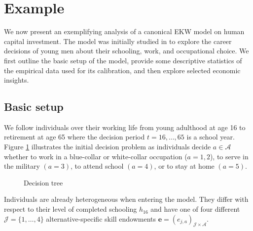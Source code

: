\section{Example}\label{Example}
We now present an exemplifying analysis of a canonical EKW model on human capital investment. The model was initially studied in \citet{Keane.1997} to explore the career decisions of young men about their schooling, work, and occupational choice. We first outline the basic setup of the model, provide some descriptive statistics of the empirical data used for its calibration, and then explore selected economic insights.
\subsection{Basic setup}
We follow individuals over their working life from young adulthood at age 16 to retirement at age 65 where the decision period $t = 16, \dots, 65$  is a school year. Figure \ref{Decision tree} illustrates the initial decision problem as individuals decide $a\in\mathcal{A}$ whether to work in a blue-collar or white-collar occupation ($a = 1, 2$), to serve in the military $(a = 3)$, to attend school $(a = 4)$, or to stay at home $(a = 5)$.\\
%
\begin{figure}[h!]\centering
\caption{Decision tree}\label{Decision tree}
\scalebox{0.75}{}
\end{figure}\FloatBarrier\vspace{1.0cm}
%
\noindent Individuals are already heterogeneous when entering the model. They differ with respect to their level of completed schooling $h_{16}$ and have one of four different $\mathcal{J} = \{1, \hdots, 4\}$ alternative-specific skill endowments $\bm{e} = \left(e_{j,a}\right)_{\mathcal{J} \times \mathcal{A}}$.\\

